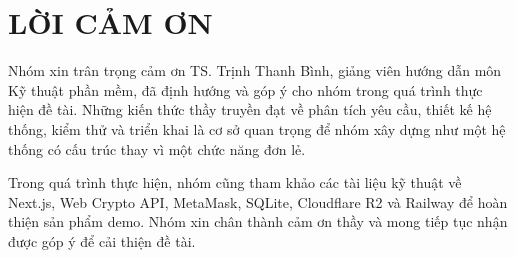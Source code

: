 \chapter*{LỜI CẢM ƠN}
{}

Nhóm xin trân trọng cảm ơn TS. Trịnh Thanh Bình, giảng viên hướng dẫn môn Kỹ thuật phần mềm, đã định hướng và góp ý cho nhóm trong quá trình thực hiện đề tài. Những kiến thức thầy truyền đạt về phân tích yêu cầu, thiết kế hệ thống, kiểm thử và triển khai là cơ sở quan trọng để nhóm xây dựng \projectname{} như một hệ thống có cấu trúc thay vì một chức năng đơn lẻ.

Trong quá trình thực hiện, nhóm cũng tham khảo các tài liệu kỹ thuật về Next.js, Web Crypto API, MetaMask, SQLite, Cloudflare R2 và Railway để hoàn thiện sản phẩm demo. Nhóm xin chân thành cảm ơn thầy và mong tiếp tục nhận được góp ý để cải thiện đề tài.

\clearpage
